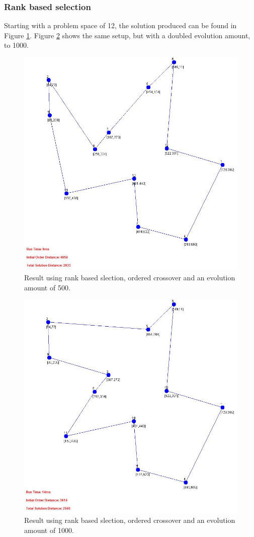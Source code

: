 \documentclass[article]{IEEEtran}
\begin{document}
\subsubsection{Rank based selection}
Starting with a problem space of 12, the solution produced can be found in Figure \ref{fig:8}. Figure \ref{fig:9} shows the same setup, but with a doubled evolution amount, to 1000.
\begin{figure}[H]
\centering
  \includegraphics[width=.9\linewidth]{images/ordered_rank_015_500_false}
  \caption{Result using rank based slection, ordered crossover and an evolution amount of 500.}
  \label{fig:8}
\end{figure}

\begin{figure}[H]
\centering
  \includegraphics[width=.9\linewidth]{images/ordered_rank_015_1000_false}
  \caption{Result using rank based slection, ordered crossover and an evolution amount of 1000.}
  \label{fig:9}
\end{figure}
\end{document}
